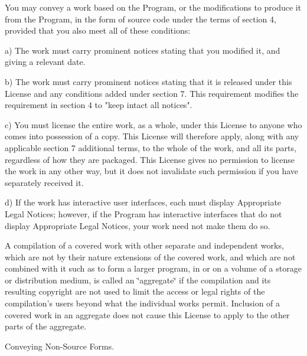 You may convey a work based on the Program, or the modifications to produce it from the Program, in the form of source code under the terms of section 4, provided that you also meet all of these conditions\+: \begin{DoxyVerb}a) The work must carry prominent notices stating that you modified
it, and giving a relevant date.

b) The work must carry prominent notices stating that it is
released under this License and any conditions added under section
7.  This requirement modifies the requirement in section 4 to
"keep intact all notices".

c) You must license the entire work, as a whole, under this
License to anyone who comes into possession of a copy.  This
License will therefore apply, along with any applicable section 7
additional terms, to the whole of the work, and all its parts,
regardless of how they are packaged.  This License gives no
permission to license the work in any other way, but it does not
invalidate such permission if you have separately received it.

d) If the work has interactive user interfaces, each must display
Appropriate Legal Notices; however, if the Program has interactive
interfaces that do not display Appropriate Legal Notices, your
work need not make them do so.
\end{DoxyVerb}


A compilation of a covered work with other separate and independent works, which are not by their nature extensions of the covered work, and which are not combined with it such as to form a larger program, in or on a volume of a storage or distribution medium, is called an \char`\"{}aggregate\char`\"{} if the compilation and its resulting copyright are not used to limit the access or legal rights of the compilation's users beyond what the individual works permit. Inclusion of a covered work in an aggregate does not cause this License to apply to the other parts of the aggregate.


\begin{DoxyEnumerate}
\item Conveying Non-\/\+Source Forms.
\end{DoxyEnumerate}

